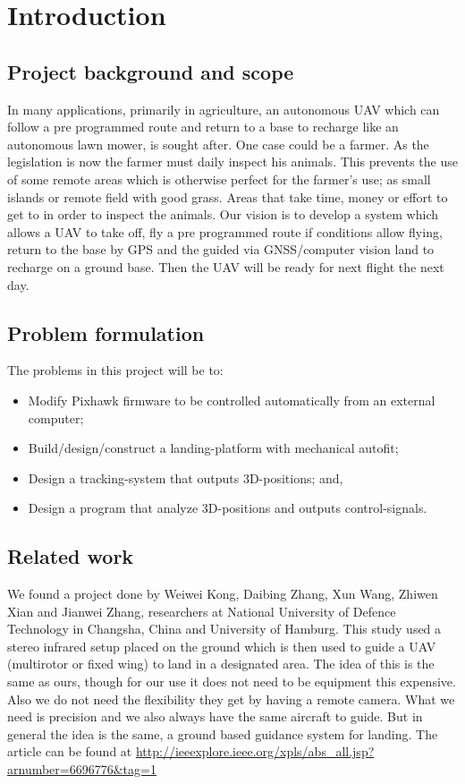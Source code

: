 \section{Introduction}
\subsection{Project background and scope}
In many applications, primarily in agriculture, an autonomous UAV which can follow a pre programmed route and return to a base to recharge like an autonomous lawn mower, is sought after. One case could be a farmer. As the legislation is now the farmer must daily inspect his animals. This prevents the use of some remote areas which is otherwise perfect for the farmer’s use; as small islands or remote field with good grass. Areas that take time, money or effort to get to in order to inspect the animals.
Our vision is to develop a system which allows a UAV to take off, fly a pre programmed route if conditions allow flying, return to the base by GPS and the guided via GNSS/computer vision land to recharge on a ground base. Then the UAV will be ready for next flight the next day.
\subsection{Problem formulation}
The problems in this project will be to:

\begin{itemize}
	\item Modify Pixhawk firmware to be controlled automatically from an external computer;
	\item Build/design/construct a landing-platform with mechanical autofit;
	\item Design a tracking-system that outputs 3D-positions; and,
	\item Design a program that analyze 3D-positions and outputs control-signals.
\end{itemize}

\subsection{Related work}
We found a project done by Weiwei Kong, Daibing Zhang, Xun Wang, Zhiwen Xian and Jianwei Zhang, researchers at National University of Defence Technology in Changsha, China and University of Hamburg. This study used a stereo infrared setup placed on the ground which is then used to guide a UAV (multirotor or fixed wing) to land in a designated area. The idea of this is the same as ours, though for our use it does not need to be equipment this expensive. Also we do not need the flexibility they get by having a remote camera. What we need is precision and we also always have the same aircraft to guide. But in general the idea is the same, a ground based guidance system for landing. The article can be found at \url{http://ieeexplore.ieee.org/xpls/abs_all.jsp?arnumber=6696776&tag=1}

